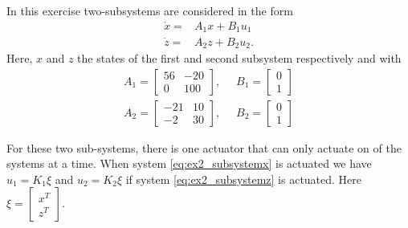 

In this exercise two-subsystems are considered in the form
\begin{align}
    \dot{x} =& A_1 x + B_1 u_1 \label{eq:ex2_subsystemx} \\
    \dot{z} =& A_2 z + B_2 u_2. \label{eq:ex2_subsystemz}
\end{align}
Here, $x$ and $z$ the states of the first and second subsystem respectively and with
\begin{align*}
    A_1 = \begin{bmatrix}56 & -20 \\ 0 & 100 \end{bmatrix},& \; \; B_1 = \begin{bmatrix} 0 \\ 1 \end{bmatrix} \\
    A_2 = \begin{bmatrix}-21 & 10 \\ -2 & 30 \end{bmatrix},& \; \; B_2 = \begin{bmatrix} 0 \\ 1 \end{bmatrix}
\end{align*}

For these two sub-systems, there is one actuator that can only actuate on of the systems at a time. When system \eqref{eq:ex2_subsystemx} is actuated we have $u_1 = K_1 \xi$ and $u_2 = K_2 \xi$ if system \eqref{eq:ex2_subsystemz} is actuated. Here $\xi = \begin{bmatrix} x^T \\ z^T \end{bmatrix}$.


